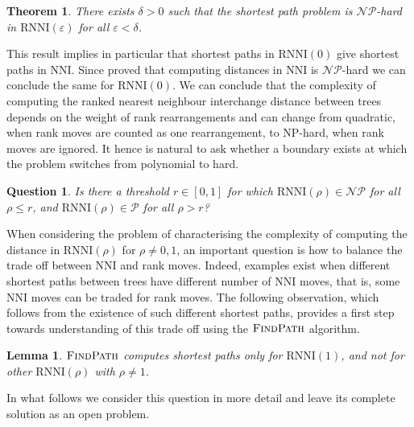 \documentclass[11pt]{amsart}
\newtheorem{theorem}{Theorem}
\newtheorem{lemma}{Lemma}
\newtheorem{question}{Question}
\newcommand{\rnni}{\mathrm{RNNI}}
\newcommand{\findpath}{\textsc{FindPath}}
\newcommand{\nni}{\mathrm{NNI}}
\newcommand{\fp}{\mathrm{FP}}
\newcommand{\np}{\mathcal{NP}}
\newcommand{\p}{\mathcal{P}}
\newcommand{\summary}[1]{} %
\begin{document}
\begin{theorem}
There exists $\delta > 0$ such that the shortest path problem is $\np$-hard in $\rnni(\varepsilon)$ for all $\varepsilon < \delta$.
\end{theorem}

This result implies in particular that shortest paths in $\rnni(0)$ give shortest paths in $\nni$.
Since \textcite{Dasgupta2000-xa} proved that computing distances in $\nni$ is $\np$-hard we can conclude the same for $\rnni(0)$.
We can conclude that the complexity of computing the ranked nearest neighbour interchange distance between trees depends on the weight of rank rearrangements and can change from quadratic, when rank moves are counted as one rearrangement, to NP-hard, when rank moves are ignored.
It hence is natural to ask whether a boundary exists at which the problem switches from polynomial to hard.

\begin{question}
Is there a threshold $r \in [0,1]$ for which $\rnni(\rho) \in \np$ for all $\rho \leq r$, and $\rnni(\rho) \in \p$ for all $\rho > r$?
\end{question}

\summary{Rank moves and $\nni$ moves can appear in different proportions on shortest paths and this is related to $\fp$ not computing shortest paths if $\rho \neq 1$}
When considering the problem of characterising the complexity of computing the distance in $\rnni(\rho)$ for $\rho \neq 0,1$, an important question is how to balance the trade off between $\nni$ and rank moves.
Indeed, examples exist when different shortest paths between trees have different number of $\nni$ moves, that is, some $\nni$ moves can be traded for rank moves.
The following observation, which follows from the existence of such different shortest paths, provides a first step towards understanding of this trade off using the $\findpath$ algorithm.

\begin{lemma}
	$\findpath$ computes shortest paths only for $\rnni(1)$, and not for other $\rnni(\rho)$ with $\rho \neq 1$.
\end{lemma}


In what follows we consider this question in more detail and leave its complete solution as an open problem.

\newpage


\printbibliography
\end{document}
